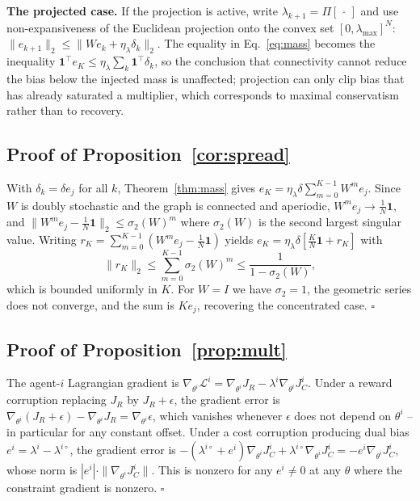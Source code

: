\documentclass{article}
\begin{document}
\textbf{The projected case.} If the projection is active, write $\lambda_{k+1} = \Pi[\,\cdot\,]$ and use non-expansiveness of the Euclidean projection onto the convex set $[0,\lambda_{\max}]^N$: $\|e_{k+1}\|_2 \le \|We_k + \eta_\lambda\delta_k\|_2$. The equality in Eq.~\eqref{eq:mass} becomes the inequality $\mathbf{1}^\top e_K \le \eta_\lambda\sum_k\mathbf{1}^\top\delta_k$, so the conclusion that connectivity cannot reduce the bias below the injected mass is unaffected; projection can only clip bias that has already saturated a multiplier, which corresponds to maximal conservatism rather than to recovery.

\subsection{Proof of Proposition~\ref{cor:spread}}

With $\delta_k = \delta e_j$ for all $k$, Theorem~\ref{thm:mass} gives $e_K = \eta_\lambda\delta\sum_{m=0}^{K-1}W^m e_j$. Since $W$ is doubly stochastic and the graph is connected and aperiodic, $W^m e_j \to \frac{1}{N}\mathbf{1}$, and $\|W^m e_j - \frac{1}{N}\mathbf{1}\|_2 \le \sigma_2(W)^m$ where $\sigma_2(W)$ is the second largest singular value. Writing $r_K = \sum_{m=0}^{K-1}(W^m e_j - \frac{1}{N}\mathbf{1})$ yields $e_K = \eta_\lambda\delta[\frac{K}{N}\mathbf{1} + r_K]$ with
\[
\|r_K\|_2 \le \sum_{m=0}^{K-1}\sigma_2(W)^m \le \frac{1}{1-\sigma_2(W)} ,
\]
which is bounded uniformly in $K$. For $W = I$ we have $\sigma_2 = 1$, the geometric series does not converge, and the sum is $Ke_j$, recovering the concentrated case. $\square$

\subsection{Proof of Proposition~\ref{prop:mult}}

The agent-$i$ Lagrangian gradient is $\nabla_{\theta^i}\mathcal{L}^i = \nabla_{\theta^i}J_R - \lambda^i\nabla_{\theta^i}J^i_C$. Under a reward corruption replacing $J_R$ by $J_R + \epsilon$, the gradient error is $\nabla_{\theta^i}(J_R+\epsilon) - \nabla_{\theta^i}J_R = \nabla_{\theta^i}\epsilon$, which vanishes whenever $\epsilon$ does not depend on $\theta^i$ -- in particular for any constant offset. Under a cost corruption producing dual bias $e^i = \lambda^i - \lambda^{i\circ}$, the gradient error is $-(\lambda^{i\circ}+e^i)\nabla_{\theta^i}J^i_C + \lambda^{i\circ}\nabla_{\theta^i}J^i_C = -e^i\nabla_{\theta^i}J^i_C$, whose norm is $|e^i|\cdot\|\nabla_{\theta^i}J^i_C\|$. This is nonzero for any $e^i \neq 0$ at any $\theta$ where the constraint gradient is nonzero. $\square$
\end{document}
